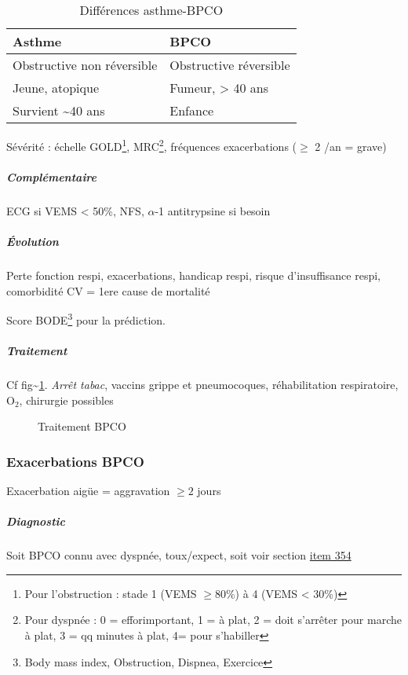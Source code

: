 \documentclass[11pt]{article}
\begin{document}
\begin{table}[htbp]
\caption{\label{tab:orgc4249af}
Différences asthme-BPCO}
\centering
\begin{tabular}{ll}
Asthme & BPCO\\
\hline
Obstructive non réversible & Obstructive réversible\\
Jeune, atopique & Fumeur, > 40 ans\\
Survient \textasciitilde{}40 ans & Enfance\\
\end{tabular}
\end{table}

Sévérité : échelle GOLD\footnote{Pour l'obstruction : stade 1 (VEMS \(\ge 80\%\)) à 4 (VEMS < 30\%)}, MRC\footnote{Pour dyspnée : 0 = efforimportant, 1 = à plat, 2 = doit s'arrêter pour
marche à plat, 3 = qq minutes à plat, 4= pour s'habiller}, fréquences exacerbations (\(\ge\) 2 /an = grave)

\subparagraph{Complémentaire}
\label{sec:orgcbb7c8d}
ECG si VEMS < 50\%, NFS, \(\alpha\)-1 antitrypsine si besoin
\subparagraph{Évolution}
\label{sec:org2cbe508}
Perte fonction respi, exacerbations, handicap respi, risque
d'insuffisance respi, comorbidité CV = 1ere cause de mortalité

Score BODE\footnote{Body mass index, Obstruction, Dispnea, Exercice} pour la prédiction.
\subparagraph{Traitement}
\label{sec:orgc11ca40}
Cf fig\textasciitilde{}\ref{fig:ttt_bpco}. 
\emph{Arrêt tabac}, vaccins grippe et pneumocoques, réhabilitation respiratoire, O\(_{\text{2}}\), chirurgie possibles
\begin{figure}[htpb]
  \centering
  \caption{Traitement BPCO}
  \label{fig:ttt_bpco}
\end{figure}

\subsubsection{Exacerbations BPCO}
\label{sec:orgd7814e8}
Exacerbation aigüe = aggravation \(\ge 2\) jours
\subparagraph{Diagnostic}
\label{sec:org2d71107}
Soit BPCO connu avec \inc dyspnée, toux/expect, soit voir section \hyperref[orge0466e4]{item 354}
\end{document}
